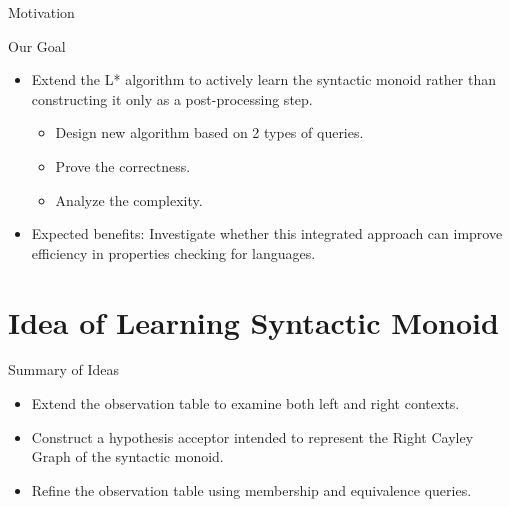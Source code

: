 \documentclass{beamer}
\begin{document}
\begin{frame}{Motivation}
   
    \begin{alertblock}{Our Goal}
        \begin{itemize}
            \item Extend the L* algorithm to actively learn the syntactic monoid rather than constructing it only as a post-processing step.
            \begin{itemize}
                \item Design new algorithm based on 2 types of queries.
                \item Prove the correctness.
                \item Analyze the complexity.
            \end{itemize}
            \item Expected benefits: Investigate whether this integrated approach can improve efficiency in properties checking for languages. 
        \end{itemize}
    \end{alertblock}
\end{frame}
\section{Idea of Learning Syntactic Monoid}


\begin{frame}{Summary of Ideas}
    \begin{itemize}
        \item Extend the observation table to examine both
        left and right contexts.

        \item Construct a hypothesis acceptor intended to represent
        the Right Cayley Graph of the syntactic monoid.

        \item Refine the observation table using membership and
        equivalence queries.
    \end{itemize}
\end{frame}
\end{document}
